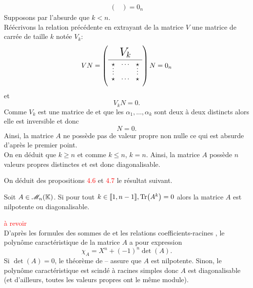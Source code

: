 \begin{demo}
\begin{itemize}
\begin{align*}
\begin{pmatrix}
            \end{pmatrix}
            =
            0_n
        \end{align*}
        Supposons par l'absurde que $k < n$. \\
        Réécrivons la relation précédente en extrayant de la matrice $V$ une matrice de  carrée de taille $k$ notée $V_k$:
        $$V N = \vandermondepartiel N = 0_n$$
        et
        $$V_k N = 0.$$
        Comme $V_k$ est une matrice de  et que les $\alpha_1, \dots, \alpha_k$ sont deux à deux distincts alors elle est inversible et donc
        $$N = 0.$$
        Ainsi, la matrice $A$ ne possède pas de valeur propre non nulle ce qui est absurde d'après le premier point. \\
        On en déduit que $k \geqslant n$ et comme $k \leqslant n$, $k=n$. Ainsi, la matrice $A$ possède $n$ valeurs propres distinctes et est donc diagonalisable.
    \end{itemize}
\end{demo}

On déduit des propositions \textcolor{red}{4.6} et \textcolor{red}{4.7} le résultat suivant.
\begin{prop}
    Soit $A \in \mathscr{M}_n(\mathbb{K})$. Si pour tout $k \in \llbracket 1, n-1 \rrbracket, \Tr(A^k) = 0$ alors la matrice $A$ est nilpotente ou diagonalisable.
\end{prop}


\begin{demo}
    \textcolor{red}{à revoir} \\
    D'après les formules des sommes de  et les relations coefficients-racines
    , le polynôme caractéristique de la matrice $A$ a pour expression
    $$\chi_A = X^n + (-1)^n \det(A).$$
    Si $\det(A) = 0$, le théorème de -- assure que $A$ est nilpotente. Sinon, le polynôme caractéristique est scindé à racines simples donc $A$ est diagonalisable (et d'ailleurs, toutes les valeurs propres ont le même module).
\end{demo}

